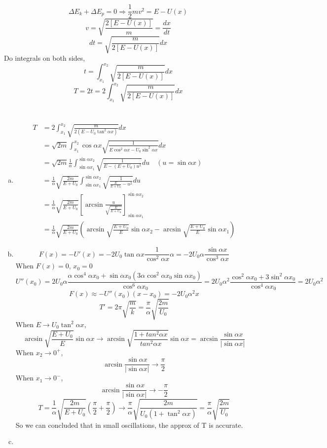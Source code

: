 \documentclass{article}
\begin{document}
\section{}
	$$\Delta E_k+\Delta E_p=0\Longrightarrow\frac{1}{2}mv^2=E-U(x)$$
	$$v=\sqrt{\frac{2[E-U(x)]}{m}}=\frac{dx}{dt}$$
	$$dt=\sqrt{\frac{m}{2[E-U(x)]}}dx$$
	Do integrals on both sides,
	$$t=\int_{x_1}^{x_2}\sqrt{\frac{m}{2[E-U(x)]}}dx$$
	$$T=2t=2\int_{x_1}^{x_2}\sqrt{\frac{m}{2[E-U(x)]}}dx$$
\section{}
\begin{enumerate}[(a)]
	\item
	\begin{align*}
	T&=2\int_{x_1}^{x_2}\sqrt{\frac{m}{2(E-U_0\tan^2\alpha x)}}dx\\
	&=\sqrt{2m}\int_{x_1}^{x_2}\cos\alpha x\sqrt{\frac{1}{E\cos^2\alpha x-U_0\sin^2\alpha x}}dx\\
	&=\sqrt{2m}\frac{1}{\alpha}\int_{\sin\alpha x_1}^{\sin\alpha x_2}\sqrt{\frac{1}{E-(E+U_0)u^2}}du\quad(u=\sin\alpha x)\\
	&=\frac{1}{\alpha}\sqrt{\frac{2m}{E+U_0}}\int_{\sin\alpha x_1}^{\sin\alpha x_2}\sqrt{\frac{1}{\frac{E}{E+U_0}-u^2}}du\\
	&=\frac{1}{\alpha}\sqrt{\frac{2m}{E+U_0}}\left[\arcsin\frac{u}{\sqrt{\frac{E}{E+U_0}}}\right]_{\sin\alpha x_1}^{\sin\alpha x_2}\\
	&=\frac{1}{\alpha}\sqrt{\frac{2m}{E+U_0}}\left(\arcsin\sqrt{\frac{E+U_0}{E}}\sin\alpha x_2-\arcsin\sqrt{\frac{E+U_0}{E}}\sin\alpha x_1\right)
	\end{align*}
	\item
	$$F(x)=-U'(x)=-2U_0\tan\alpha x\frac{1}{\cos^2\alpha x}\alpha=-2U_0\alpha\frac{\sin\alpha x}{\cos^3\alpha x}$$
	When $F(x)=0$, $x_0=0$
	$$U''(x_0)=2U_0\alpha\frac{\alpha\cos^4\alpha x_0+\sin\alpha x_0(3\alpha\cos^2\alpha x_0\sin\alpha x_0)}{\cos^6\alpha x_0}=2U_0\alpha^2\frac{\cos^2\alpha x_0+3\sin^2\alpha x_0}{\cos^4\alpha x_0}=2U_0\alpha^2$$
	$$F(x)\approx-U''(x_0)(x-x_0)=-2U_0\alpha^2x$$
	$$T'=2\pi\sqrt{\frac{m}{k}}=\frac{\pi}{\alpha}\sqrt{\frac{2m}{U_0}}$$
	When $E\rightarrow U_0\tan^2\alpha x$,
	$$\arcsin\sqrt{\frac{E+U_0}{E}}\sin\alpha x\rightarrow\arcsin\sqrt{\frac{1+tan^2\alpha x}{tan^2\alpha x}}\sin\alpha x=\arcsin\frac{\sin\alpha x}{|\sin\alpha x|}$$
	When $x_2\rightarrow0^+$, 
	$$\arcsin\frac{\sin\alpha x}{|\sin\alpha x|}\rightarrow\frac{\pi}{2}$$
	When $x_1\rightarrow0^-$, 
	$$\arcsin\frac{\sin\alpha x}{|\sin\alpha x|}\rightarrow-\frac{\pi}{2}$$
	$$T=\frac{1}{\alpha}\sqrt{\frac{2m}{E+U_0}}\left(\frac{\pi}{2}+\frac{\pi}{2}\right)\rightarrow\frac{\pi}{\alpha}\sqrt{\frac{2m}{U_0(1+\tan^2\alpha x)}}=\frac{\pi}{\alpha}\sqrt{\frac{2m}{U_0}}$$
	So we can concluded that in small oscillations, the approx of T is accurate.
	\item
\end{enumerate}
\end{document}
